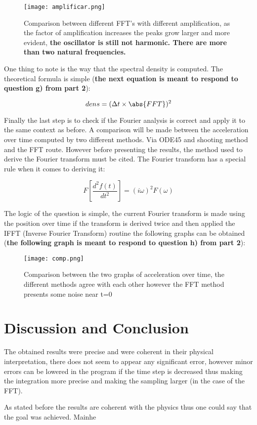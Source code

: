 \documentclass[letterpaper,12pt]{article}
\begin{document}
\begin{figure}[h]
  \centering
    \texttt{[image: amplificar.png]}     
    \caption{Comparison between different FFT's  with different amplification, as the factor of amplification increases the peaks grow larger and more evident, \textbf{the oscillator is still not harmonic. There are more than two natural frequencies.} }
\end{figure} 

\indent 
One thing to note is the way that the spectral density is computed. The theoretical formula is simple (\textbf{the next equation is meant to respond to question g) from part 2}):


\begin{equation*}
dens=(\Delta t \times \abs{FFT})^2
\end{equation*}


\indent
Finally the last step is to check if the Fourier analysis is correct and apply it to the same context as before. A comparison will be made between the acceleration over time computed by two different methods. Via ODE45 and shooting method and the FFT route. However before presenting the results, the method used to derive the Fourier transform must be cited. The Fourier transform has a special rule when it comes to deriving it:

\begin{equation*}
F \left[ \frac{d^2f(t)}{dt^2} \right]= (i \omega)^2 F(\omega)
\end{equation*}

The logic of the question is simple, the current Fourier transform is made using the position over time if the transform is derived twice and then applied the IFFT (Inverse Fourier Transform) routine the following graphs can be obtained (\textbf{the following graph is meant to respond to question h) from part 2}):

\newpage
\begin{figure}[h]
  \centering
    \texttt{[image: comp.png]}     
    \caption{Comparison between the two graphs of acceleration over time, the different methods agree with each other however the FFT method presents some noise near t=0}
\end{figure} 

\section{Discussion and Conclusion}
The obtained results were precise and were coherent in their physical interpretation, there does not seem to appear any significant error, however minor errors can be lowered in the program if the time step is decreased thus making the integration more precise and making the sampling larger (in the case of the FFT). 

\indent
As stated before the results are coherent with the physics thus one could say that the goal was achieved. Mainhe
\end{document}
